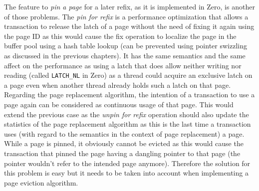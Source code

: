 	The feature to \emph{pin a page} for a later refix, as it is implemented in Zero, is another of those problems. The \emph{pin for refix} is a performance optimization that allows a transaction to release the latch of a page without the need of fixing it again using the page ID as this would cause the fix operation to localize the page in the buffer pool using a hash table lookup (can be prevented using pointer swizzling as discussed in the previous chapters). It has the same semantics and the same affect on the performance as using a latch that does allow neither writing nor reading (called \lstinline{LATCH_NL} in Zero) as a thread could acquire an exclusive latch on a page even when another thread already holds such a latch on that page. Regarding the page replacement algorithm, the intention of a transaction to use a page again can be considered as continuous usage of that page. This would extend the previous case as the \emph{unpin for refix} operation should also update the statistics of the page replacement algorithm as this is the last time a transaction uses (with regard to the semantics in the context of page replacement) a page. While a page is pinned, it obviously cannot be evicted as this would cause the transaction that pinned the page having a dangling pointer to that page (the pointer wouldn't refer to the intended page anymore). Therefore the solution for this problem is easy but it needs to be taken into account when implementing a page eviction algorithm.
	
